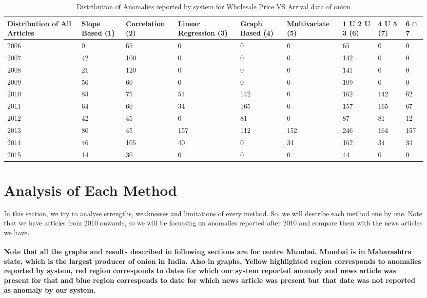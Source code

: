 	
	\begin{table}[]
	\centering
	\resizebox{\textwidth}{!}
	{\begin{tabular}{|l|l|l|l|l|l|l|l|l|}
	\hline
	Distribution of All Articles & Slope Based (1) & Correlation (2) & Linear Regression (3) & Graph Based (4) & Multivariate (5) & 1 U 2 U 3 (6) & 4 U 5 (7) & 6 $\cap$ 7  \\
	\hline
	2006 & 0  & 65  & 0   & 0   & 0   & 65  & 0   & 0   \\
	\hline
	2007 & 42 & 100 & 0   & 0   & 0   & 142 & 0   & 0   \\
	\hline
	2008 & 21 & 120 & 0   & 0   & 0   & 141 & 0   & 0   \\
	\hline
	2009 & 56 & 60  & 0   & 0   & 0   & 109 & 0   & 0   \\
	\hline
	2010 & 83 & 75  & 51  & 142 & 0   & 162 & 142 & 62  \\
	\hline
	2011 & 64 & 60  & 34  & 165 & 0   & 157 & 165 & 67  \\
	\hline
	2012 & 42 & 45  & 0   & 81  & 0   & 87  & 81  & 12  \\
	\hline
	2013 & 80 & 45  & 157 & 112 & 152 & 246 & 164 & 157 \\
	\hline
	2014 & 46 & 105 & 40  & 0   & 34  & 162 & 34  & 34  \\
	\hline
	2015 & 14 & 30  & 0   & 0   & 0   & 44  & 0   & 0   \\
	\hline
	\end{tabular}}
	\caption{Distribution of Anomalies reported by system for Wholesale Price VS Arrival data of onion }
	\label{WholesaleVsArrivalDist}
	\end{table}
	

\section{Analysis of Each Method}

In this section, we try to analyse strengths, weaknesses and limitations of every method. So, we will describe each method one by one. Note that we have articles from 2010 onwards, so we will be focussing on anomalies reported after 2010 and compare them with the news articles we have. \\
\\
\textbf{Note that all the graphs and results described in following sections are for centre Mumbai. Mumbai is in Maharashtra state, which is the largest producer of onion in India. Also in graphs, Yellow highlighted region corresponds to anomalies reported by system, red region corresponds to dates for which our system reported anomaly and news article was present for that and blue region corresponds to date for which news article was present but that date was not reported as anomaly by our system.}

